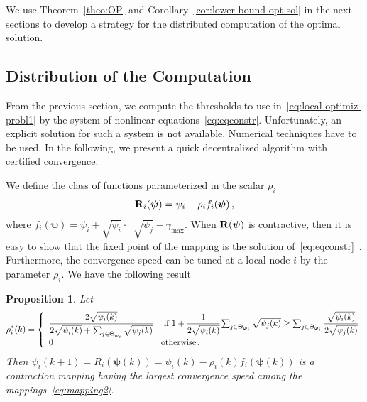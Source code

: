 \documentclass[a4paper,notitlepage,onecolumn]{article}
\def\Rb{{\bf R}}
\def\Rb{{\bf R}}
\def\psib{\boldsymbol{\psi}}
\def\varphib{\boldsymbol{\varphi}}
\newtheorem{proposition}[theorem]{Proposition}
\numberwithin{equation}{section}
\begin{document}
We use Theorem~\ref{theo:OP} and
Corollary~\ref{cor:lower-bound-opt-sol} in the next sections to
develop a strategy for the distributed computation of the optimal
solution.

\subsection{Distribution of the Computation}

From the previous section, we compute the thresholds to use
in~\eqref{eq:local-optimiz-probl1} by the system of nonlinear
equations~\eqref{eq:eqconstr}. Unfortunately, an explicit solution
for such a system is not available. Numerical techniques have to
be used. In the following, we present a quick decentralized
algorithm with certified convergence.

We define the class of functions parameterized in the scalar
$\rho_i$
\begin{align}
    \label{eq:mapping2}
    \Rb_i(\psib)=\psi_i - \rho_i f_i(\psib) \,,
\end{align}
where $ f_i(\psib)= \psi_i +  \sqrt{\psi_i} \cdot \mathop{\sum_{j\in \Theta_{\varphib_i}}}\sqrt{\psi_j} - \gamma_{\max}$.
When $\Rb(\psib)$ is contractive, then it is easy to show that the fixed point of the mapping is the solution of~\eqref{eq:eqconstr}~\cite[Pag.191]{tsi}.  Furthermore, the convergence speed can be tuned at a local node $i$ by the parameter $\rho_i$. We have the following result
\begin{proposition} \label{prop:fastcontrmapping}
Let
\begin{align} \label{eq:gammat}
\rho^*_i(k)= \left\{
             \begin{array}{ll}
               \cfrac{2\sqrt{\psi_i(k)}}{{2\sqrt{\psi_i(k)}+\mathop{\sum_{j\in \Theta_{\varphib_i}}} \sqrt{\psi_j(k)}}}  & \mbox{ \rm if } 1 +  \cfrac{1}{2\sqrt{\psi_i(k)}} \mathop{\sum_{j\in \Theta_{\varphib_i}}}\sqrt{\psi_j(k)} \geq \mathop{\sum_{j\in \Theta_{\varphib_i}}}\cfrac{\sqrt{\psi_i(k)} }{2\sqrt{\psi_j(k)}} \\
               0 & \mbox{\rm otherwise\,.}
             \end{array}
           \right.
\end{align}
Then $\psi_i(k+1)=R_i(\psib(k))= \psi_i(k) - \rho_i(k) f_i(\psib(k))$ is a contraction mapping having the largest convergence
speed among the mappings~\eqref{eq:mapping2}.
\end{proposition}
\end{document}
